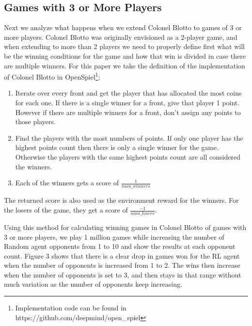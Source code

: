\documentclass[11pt, oneside]{article}   	%
\begin{document}
\subsection{Games with 3 or More Players}

Next we analyze what happens when we extend Colonel Blotto to games of 3 or more players. Colonel Blotto was originally envisioned as a 2-player game, and when extending to more than 2 players we need to properly define first what will be the winning conditions for the game and how that win is divided in case there are multiple winners. For this paper we take the definition of the implementation of Colonel Blotto in OpenSpiel\footnote{Implementation code can be found in https://github.com/deepmind/open\_spiel}:

\begin{enumerate}
  \item Iterate over every front and get the player that has allocated the most coins for each one. If there is a single winner for a front, give that player 1 point. However if there are multiple winners for a front, don't assign any points to those players.
  \item Find the players with the most numbers of points. If only one player has the highest points count then there is only a single winner for the game. Otherwise the players with the same highest points count are all considered the winners.
  \item Each of the winners gets a score of $\frac{1}{num\_winners}$ %
\end{enumerate}

The returned score is also used as the environment reward for the winners. For the losers of the game, they get a score of $\frac{-1}{num\_losers}$.

\hfill

Using this method for calculating winning games in Colonel Blotto of games with 3 or more players, we play 1 million games while increasing the number of Random agent opponents from 1 to 10 and show the results at each opponent count. Figure 3 shows that there is a clear drop in games won for the RL agent when the number of opponents is increased from 1 to 2. The wins then increase when the number of opponents is set to 3, and then stays in that range without much variation as the number of opponents keep increasing. 

\hfill
\end{document}
